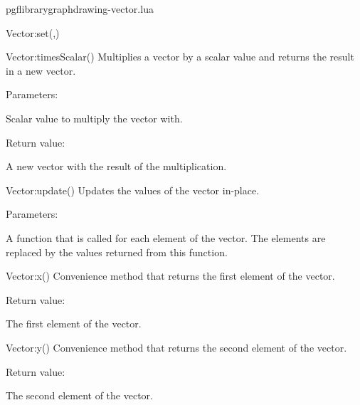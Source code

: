 \begin{filedescription}{pgflibrarygraphdrawing-vector.lua}
\begin{luacommand}{{Vector:set}(,)}
\end{luacommand}
\begin{luacommand}{{Vector:timesScalar}()}
Multiplies a vector by a scalar value and returns the result in a new vector. 

Parameters:
\begin{parameterdescription}
	\item[\meta{scalar}] Scalar value to multiply the vector with. 
\end{parameterdescription}


Return value:
\begin{parameterdescription} 
  \item[] A new vector with the result of the multiplication. 
\end{parameterdescription}


\end{luacommand}
\begin{luacommand}{{Vector:update}()}
Updates the values of the vector in-place. 

Parameters:
\begin{parameterdescription}
	\item[\meta{update\_function}] A function that is called for each element of the vector. The elements are replaced by the values returned from this function. 
\end{parameterdescription}



\end{luacommand}
\begin{luacommand}{{Vector:x}()}
Convenience method that returns the first element of the vector. 


Return value:
\begin{parameterdescription} 
  \item[] The first element of the vector. 
\end{parameterdescription}


\end{luacommand}
\begin{luacommand}{{Vector:y}()}
Convenience method that returns the second element of the vector. 


Return value:
\begin{parameterdescription} 
  \item[] The second element of the vector. 
\end{parameterdescription}


\end{luacommand}

\end{filedescription}
